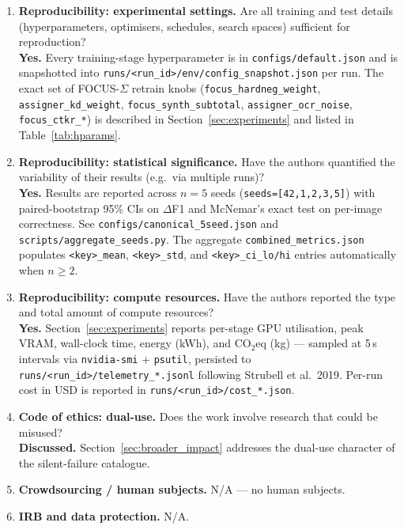 \begin{enumerate}
\item \textbf{Reproducibility: experimental settings.}  Are all
training and test details (hyperparameters, optimisers, schedules,
search spaces) sufficient for reproduction?
\\\textbf{Yes.}  Every training-stage hyperparameter is in
\texttt{configs/default.json} and is snapshotted into
\texttt{runs/<run\_id>/env/config\_snapshot.json} per run.  The
exact set of FOCUS-$\Sigma$ retrain knobs
(\texttt{focus\_hardneg\_weight}, \texttt{assigner\_kd\_weight},
\texttt{focus\_synth\_subtotal}, \texttt{assigner\_ocr\_noise},
\texttt{focus\_ctkr\_*}) is described in
Section~\ref{sec:experiments} and listed in
Table~\ref{tab:hparams}.

\item \textbf{Reproducibility: statistical significance.}  Have the
authors quantified the variability of their results (e.g.\ via
multiple runs)?
\\\textbf{Yes.}  Results are reported across $n = 5$ seeds
(\texttt{seeds=[42,1,2,3,5]}) with paired-bootstrap 95\% CIs on
$\Delta$F1 and McNemar's exact test on per-image correctness.  See
\texttt{configs/canonical\_5seed.json} and
\texttt{scripts/aggregate\_seeds.py}.  The aggregate
\texttt{combined\_metrics.json} populates \texttt{<key>\_mean},
\texttt{<key>\_std}, and \texttt{<key>\_ci\_lo/hi} entries
automatically when $n \ge 2$.

\item \textbf{Reproducibility: compute resources.}  Have the authors
reported the type and total amount of compute resources?
\\\textbf{Yes.}  Section~\ref{sec:experiments} reports per-stage GPU
utilisation, peak VRAM, wall-clock time, energy (kWh), and CO$_2$eq
(kg) — sampled at 5\,s intervals via \texttt{nvidia-smi} +
\texttt{psutil}, persisted to \texttt{runs/<run\_id>/telemetry\_*.jsonl}
following Strubell et al.\ 2019.  Per-run cost in USD is reported in
\texttt{runs/<run\_id>/cost\_*.json}.

\item \textbf{Code of ethics: dual-use.}  Does the work involve
research that could be misused?
\\\textbf{Discussed.}  Section~\ref{sec:broader_impact} addresses the
dual-use character of the silent-failure catalogue.

\item \textbf{Crowdsourcing / human subjects.}  N/A — no human
subjects.

\item \textbf{IRB and data protection.}  N/A.


\end{enumerate}
